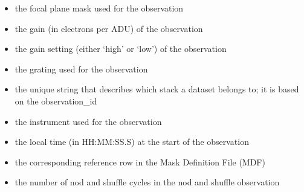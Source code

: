 \documentclass[letterpaper,10pt,english]{sphinxmanual}
\begin{document}
\begin{itemize}
\item {} 
the focal plane mask used for the observation

\end{itemize}

\begin{itemize}
\item {} 
the gain (in electrons per ADU) of the observation

\end{itemize}

\begin{itemize}
\item {} 
the gain setting (either `high' or `low') of the observation

\end{itemize}

\begin{itemize}
\item {} 
the grating used for the observation

\end{itemize}

\begin{itemize}
\item {} 
the unique string that describes which stack a dataset belongs to; it is
based on the observation\_id

\end{itemize}

\begin{itemize}
\item {} 
the instrument used for the observation

\end{itemize}

\begin{itemize}
\item {} 
the local time (in HH:MM:SS.S) at the start of the observation

\end{itemize}

\begin{itemize}
\item {} 
the corresponding reference row in the Mask Definition File (MDF)

\end{itemize}

\begin{itemize}
\item {} 
the number of nod and shuffle cycles in the nod and shuffle observation

\end{itemize}
\end{document}
